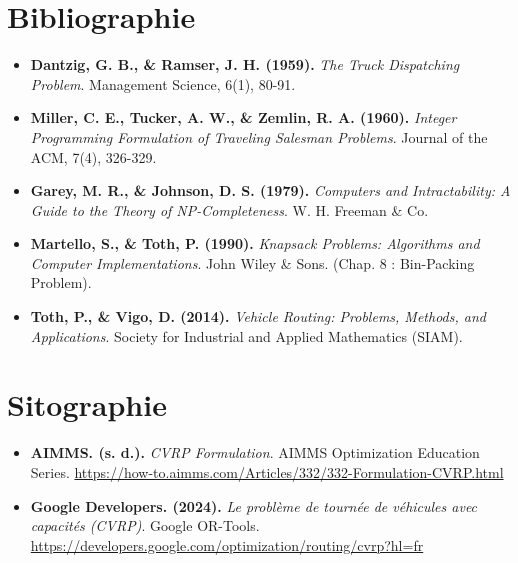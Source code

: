\section*{Bibliographie}
\begin{itemize}
    \item[\hypertarget{ref:dantzig1959}{[1]}] \textbf{Dantzig, G. B., \& Ramser, J. H. (1959).} \textit{The Truck Dispatching Problem}. Management Science, 6(1), 80-91.
    \item[\hypertarget{ref:mtz1960}{[2]}] \textbf{Miller, C. E., Tucker, A. W., \& Zemlin, R. A. (1960).} \textit{Integer Programming Formulation of Traveling Salesman Problems}. Journal of the ACM, 7(4), 326-329.
    \item[\hypertarget{ref:garey1979}{[3]}] \textbf{Garey, M. R., \& Johnson, D. S. (1979).} \textit{Computers and Intractability: A Guide to the Theory of NP-Completeness}. W. H. Freeman \& Co.
    \item[\hypertarget{ref:martello1990}{[4]}] \textbf{Martello, S., \& Toth, P. (1990).} \textit{Knapsack Problems: Algorithms and Computer Implementations}. John Wiley \& Sons. (Chap. 8 : Bin-Packing Problem).
    \item[\hypertarget{ref:toth2014}{[5]}] \textbf{Toth, P., \& Vigo, D. (2014).} \textit{Vehicle Routing: Problems, Methods, and Applications}. Society for Industrial and Applied Mathematics (SIAM).
\end{itemize}

\newpage

\section*{Sitographie}
\begin{itemize}
    \item[\hypertarget{ref:aimms}{[6]}] \textbf{AIMMS. (s. d.).} \textit{CVRP Formulation}. AIMMS Optimization Education Series. \url{https://how-to.aimms.com/Articles/332/332-Formulation-CVRP.html}
    \item[\hypertarget{ref:ortools}{[7]}] \textbf{Google Developers. (2024).} \textit{Le problème de tournée de véhicules avec capacités (CVRP)}. Google OR-Tools. \url{https://developers.google.com/optimization/routing/cvrp?hl=fr}
\end{itemize}